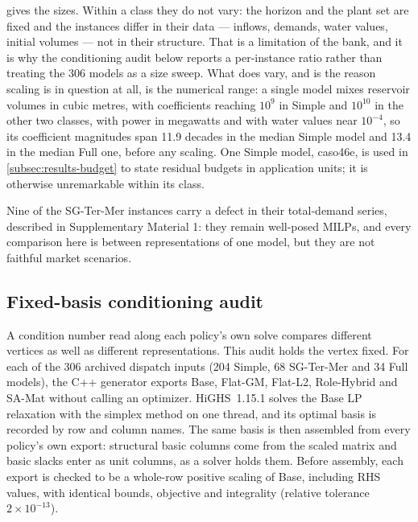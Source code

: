 \documentclass[11pt]{article}
\theoremstyle{definition}
\theoremstyle{remark}
\begin{document}
 gives the sizes. Within a class they do not vary: the horizon and the
plant set are fixed and the instances differ in their data --- inflows, demands, water values,
initial volumes --- not in their structure. That is a limitation of the bank, and it is why the
conditioning audit below reports a per-instance ratio rather than treating the 306 models as a
size sweep. What does vary, and is the reason scaling is in question at all, is the numerical
range: a single model mixes reservoir volumes in cubic metres, with coefficients reaching
$10^9$ in Simple and $10^{10}$ in the other two classes, with power in megawatts and with water
values near $10^{-4}$, so its coefficient magnitudes span 11.9 decades in the median Simple
model and 13.4 in the median Full one, before any scaling. One Simple model, caso46e, is used in
\cref{subsec:results-budget} to state residual budgets in application units; it is otherwise
unremarkable within its class.

Nine of the SG-Ter-Mer instances carry a defect in their total-demand series, described in
Supplementary Material 1: they remain well-posed MILPs, and every comparison here is between
representations of one model, but they are not faithful market scenarios.

\begin{table}[tb]
\centering\small
\caption{The dispatch instance bank, from the unscaled export of every model. Entries are the
median and, where it differs, the range over the class. Sizes are constant within a class;
decades is $\log_{10}$ of the ratio between the largest and smallest magnitude in a model.}
\label{tab:instance-bank}

\end{table}

\subsection{Fixed-basis conditioning audit}
\label{subsec:design-fixed-basis}
A condition number read along each policy's own solve compares different vertices as well as
different representations. This audit holds the vertex fixed. For each of the 306 archived
dispatch inputs (204 Simple, 68 SG-Ter-Mer and 34 Full models), the C++ generator exports Base,
Flat-GM, Flat-L2, Role-Hybrid and SA-Mat without calling an optimizer. HiGHS~1.15.1 solves the
Base LP relaxation with the simplex method on one thread, and its optimal basis is recorded by
row and column names. The same basis is then assembled from every policy's own export:
structural basic columns come from the scaled matrix and basic slacks enter as unit columns, as
a solver holds them. Before assembly, each export is checked to be a whole-row positive scaling
of Base, including RHS values, with identical bounds, objective and integrality (relative
tolerance $2\times10^{-13}$).
\end{document}
